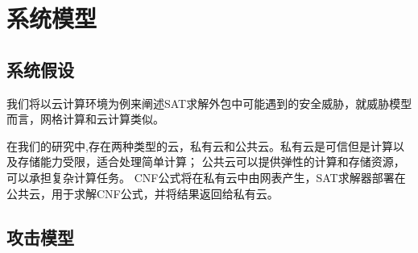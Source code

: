 \section{系统模型}
\subsection{系统假设}
我们将以云计算环境为例来阐述SAT求解外包中可能遇到的安全威胁，就威胁模型而言，网格计算和云计算类似。

在我们的研究中,存在两种类型的云，私有云和公共云。私有云是可信但是计算以及存储能力受限，适合处理简单计算；
公共云可以提供弹性的计算和存储资源，可以承担复杂计算任务。
CNF公式将在私有云中由网表产生，SAT求解器部署在公共云，用于求解CNF公式，并将结果返回给私有云。

\subsection{攻击模型}


